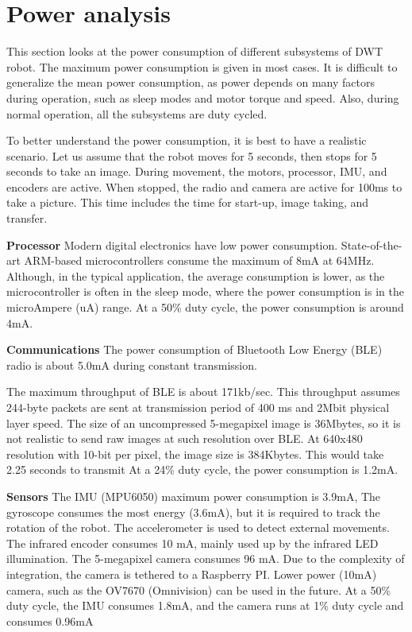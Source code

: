 \section{Power analysis}
This section looks at the power consumption of different subsystems of  DWT robot. The maximum power consumption is given in most cases. It is difficult to generalize the mean power consumption, as power depends on many factors during operation, such as sleep modes and motor torque and speed. 
Also, during normal operation, all the subsystems are duty cycled. 

To better understand the power consumption, it is best to have a realistic scenario. Let us assume that the robot moves for 5 seconds, then stops for 5 seconds to take an image. During movement, the motors, processor, IMU, and encoders are active. When stopped, the radio and camera are active for 100ms to take a picture. This time includes the time for start-up, image taking, and transfer. 

\textbf{Processor}
Modern digital electronics have low power consumption. State-of-the-art ARM-based microcontrollers consume the maximum of 8mA at 64MHz. Although, in the typical application, the average consumption is lower, as the microcontroller is often in the sleep mode, where the power consumption is in the microAmpere (uA) range. 
At a 50\% duty cycle, the power consumption is around 4mA. 

\textbf{Communications}
The power consumption of Bluetooth Low Energy (BLE) radio is about 5.0mA during constant transmission. 

The maximum throughput of BLE is about 171kb/sec. This throughput assumes 244-byte packets are sent at transmission period of 400 ms and 2Mbit physical layer speed. The size of an uncompressed 5-megapixel image is 36Mbytes, so it is not realistic to send raw images at such resolution over BLE. At 640x480 resolution with 10-bit per pixel, the image size is 384Kbytes. This would take 2.25 seconds to transmit
At a 24\% duty cycle, the power consumption is 1.2mA. 



\textbf{Sensors}
The IMU (MPU6050) maximum power consumption is 3.9mA, The gyroscope consumes the most energy (3.6mA), but it is required to track the rotation of the robot. The accelerometer is used to detect external movements. The infrared encoder consumes 10 mA, mainly used up by the infrared LED illumination. The 5-megapixel camera consumes 96 mA. Due to the complexity of integration, the camera is tethered to a Raspberry PI. Lower power (10mA)  camera, such as the OV7670 (Omnivision) can be used in the future. 
At a 50\% duty cycle, the IMU consumes 1.8mA, and the camera runs at 1\% duty cycle and consumes 0.96mA 


